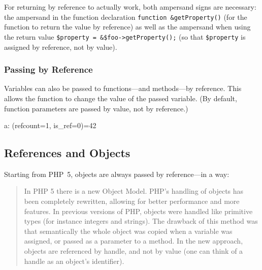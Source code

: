 
For returning by reference to actually work, both ampersand signs are necessary: the ampersand in the function declaration \texttt{function \&getProperty()} (for the function to return the value by reference) as well as the ampersand when using the return value \texttt{\$property = \&\$foo->getProperty();} (so that \texttt{\$property} is assigned by reference, not by value).


\subsubsection{Passing by Reference}

Variables can also be passed to functions---and methods---by reference. \cite{php-manual-passing-by-reference} This allows the function to change the value of the passed variable. (By default, function parameters are passed by value, not by reference.)


\begin{textcode}
a: (refcount=1, is_ref=0)=42
\end{textcode}


\subsection{References and Objects}

Starting from PHP~5, objects are always passed by reference---in a way:~\cite{php-manual-migration5-oop}

\begin{quote}
In PHP 5 there is a new Object Model. PHP's handling of objects has been completely rewritten, allowing for better performance and more features. In previous versions of PHP, objects were handled like primitive types (for instance integers and strings). The drawback of this method was that semantically the whole object was copied when a variable was assigned, or passed as a parameter to a method. In the new approach, objects are referenced by handle, and not by value (one can think of a handle as an object's identifier).
\end{quote}

